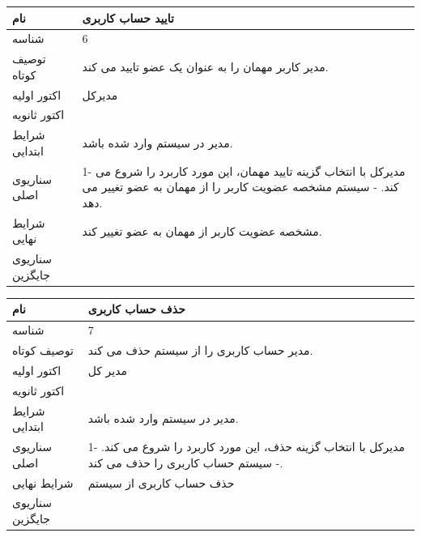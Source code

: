 \begin{tabular}{|p{2cm}|p{10cm}|}
\hline
نام
&
تایید حساب کاربری
\\
\hline
شناسه
&
6
\\
\hline
توصیف کوتاه
&
مدیر کاربر مهمان را به عنوان یک عضو تایید می کند.
\\
\hline
اکتور اولیه
&
مدیرکل
\\
\hline
اکتور ثانویه
&

\\
\hline
شرایط ابتدایی
&
مدیر در سیستم وارد شده باشد.
\\
\hline
سناریوی اصلی
&
1-	مدیرکل با انتخاب گزینه تایید مهمان، این مورد کاربرد را شروع می کند.
\newline
2-	سیستم مشخصه عضویت کاربر را از مهمان به عضو تغییر می دهد.
\\
\hline
شرایط نهایی
&
مشخصه عضویت کاربر از مهمان به عضو تغییر کند.
\\
\hline
سناریوی جایگزین
&

\\
\hline
\end{tabular}

\vspace{2cm}


\begin{tabular}{|p{2cm}|p{10cm}|}
\hline
نام
&
حذف حساب کاربری
\\
\hline
شناسه
&
7
\\
\hline
توصیف کوتاه
&
مدیر حساب کاربری را از سیستم حذف می کند.
\\
\hline
اکتور اولیه
&
مدیر کل
\\
\hline
اکتور ثانویه
&

\\
\hline
شرایط ابتدایی
&
مدیر در سیستم وارد شده باشد.
\\
\hline
سناریوی اصلی
&
1-	مدیرکل با انتخاب گزینه حذف، این مورد کاربرد را شروع می کند.
\newline
2-	سیستم حساب کاربری را حذف می کند.
\\
\hline
شرایط نهایی
&
حذف حساب کاربری از سیستم
\\
\hline
سناریوی جایگزین
&

\\
\hline
\end{tabular}

\vspace{2cm}


